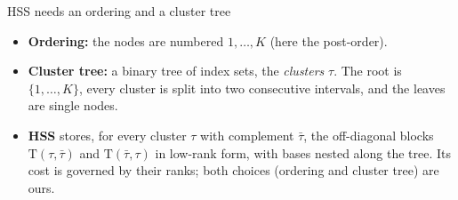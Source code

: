 \documentclass[aspectratio=169,11pt]{beamer}
\begin{document}
\begin{frame}{HSS needs an ordering and a cluster tree}
\vspace{2mm}
\footnotesize
\begin{itemize}
\item \textbf{Ordering:} the nodes are numbered $1,\dots,K$ (here the post-order).
\item \textbf{Cluster tree:} a binary tree of index sets, the \emph{clusters} $\tau$. The root is $\{1,\dots,K\}$, every
  cluster is split into two consecutive intervals, and the leaves are single nodes.
\item \textbf{HSS} stores, for every cluster $\tau$ with complement $\bar\tau$, the off-diagonal blocks
  $\mathrm{T}(\tau,\bar\tau)$ and $\mathrm{T}(\bar\tau,\tau)$ in low-rank form, with bases nested along the tree.
  Its cost is governed by their ranks; both choices (ordering and cluster tree) are ours.
\end{itemize}
\end{frame}
\end{document}
